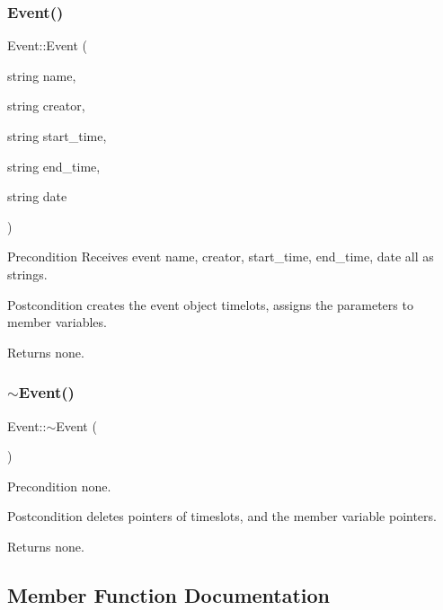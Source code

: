 \subsubsection{\texorpdfstring{Event()}{Event()}}
{\footnotesize\ttfamily Event\+::\+Event (\begin{DoxyParamCaption}\item[{string}]{name,  }\item[{string}]{creator,  }\item[{string}]{start\+\_\+time,  }\item[{string}]{end\+\_\+time,  }\item[{string}]{date }\end{DoxyParamCaption})}

\begin{DoxyPrecond}{Precondition}
Receives event name, creator, start\+\_\+time, end\+\_\+time, date all as strings. 
\end{DoxyPrecond}
\begin{DoxyPostcond}{Postcondition}
creates the event object timelots, assigns the parameters to member variables. 
\end{DoxyPostcond}
\begin{DoxyReturn}{Returns}
none. 
\end{DoxyReturn}
\mbox{\label{class_event_a7704ec01ce91e673885792054214b3d2}} 
\subsubsection{\texorpdfstring{$\sim$\+Event()}{~Event()}}
{\footnotesize\ttfamily Event\+::$\sim$\+Event (\begin{DoxyParamCaption}{ }\end{DoxyParamCaption})}

\begin{DoxyPrecond}{Precondition}
none. 
\end{DoxyPrecond}
\begin{DoxyPostcond}{Postcondition}
deletes pointers of timeslots, and the member variable pointers. 
\end{DoxyPostcond}
\begin{DoxyReturn}{Returns}
none. 
\end{DoxyReturn}


\subsection{Member Function Documentation}
\mbox{\label{class_event_a88bba1204c92cc12830981c04a8c3a51}} 
